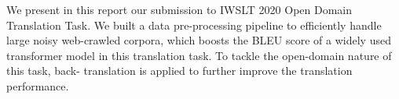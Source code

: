 We present in this report our submission to IWSLT 2020 Open Domain Translation Task. We built a data pre-processing pipeline to efficiently handle large noisy web-crawled corpora, which boosts the BLEU score of a widely used transformer model in this translation task. To tackle the open-domain nature of this task, back- translation is applied to further improve the translation performance.
